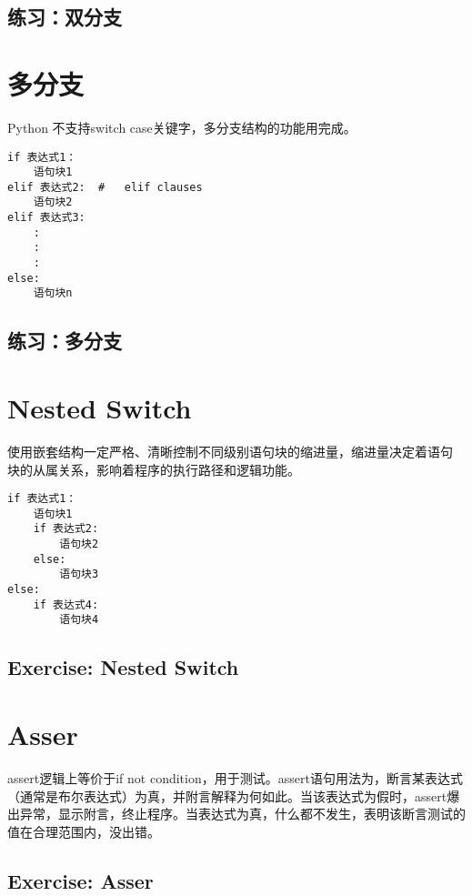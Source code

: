 \subsection{练习：双分支}
\section{多分支}
Python 不支持switch case关键字，多分支结构的功能用完成。
\begin{framed}
\begin{verbatim}
if 表达式1：
    语句块1
elif 表达式2:  #   elif clauses
    语句块2
elif 表达式3:
    :
    :
    :
else:
    语句块n
\end{verbatim}
\end{framed}
\subsection{练习：多分支}
\section{Nested Switch}
使用嵌套结构一定严格、清晰控制不同级别语句块的缩进量，缩进量决定着语句
块的从属关系，影响着程序的执行路径和逻辑功能。
\begin{framed}
\begin{verbatim}
if 表达式1：
    语句块1
    if 表达式2:
        语句块2
    else:
        语句块3
else:
    if 表达式4:
        语句块4
\end{verbatim}
\end{framed}
\subsection{Exercise: Nested Switch}
\section{Asser}
assert逻辑上等价于if not condition，用于测试。assert语句用法为，断言某表达式（通常是布尔表达式）为真，并附言解释为何如此。当该表达式为假时，assert爆出异常，显示附言，终止程序。当表达式为真，什么都不发生，表明该断言测试的值在合理范围内，没出错。
\subsection{Exercise: Asser}
